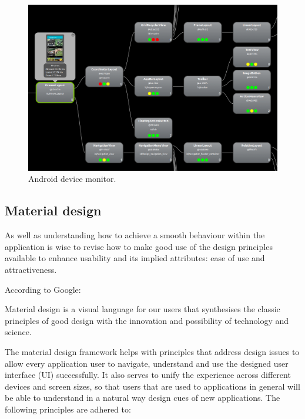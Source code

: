 \begin{figure}[H]
\begin{adjustbox}{width=1\textwidth,center=\textwidth}
  \centering
  \includegraphics[scale=1]{images/android_device_monitor_2.png}
\end{adjustbox}
  \caption[Android device monitor]{Android device monitor.}
  \label{fig:android_device_monitor}
\end{figure}

\subsection{Material design}
As well as understanding how to achieve a smooth behaviour within the application is wise to revise how to make good use of the design principles available to enhance usability and its implied attributes: ease of use and attractiveness. 

According to Google: \begin{displayquote}Material design is a visual language for our users that synthesises the classic principles of good design with the innovation and possibility of technology and science. \end{displayquote} 

The material design framework helps with principles that address design issues to allow every application user to navigate, understand and use the designed user interface (UI) successfully. It also serves to unify the experience across different devices and screen sizes, so that users that are used to applications in general will be able to understand in a natural way design cues of new applications. The following principles are adhered to: 

